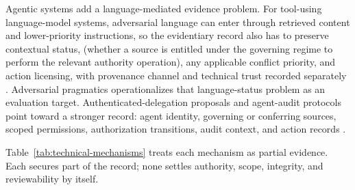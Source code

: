 Agentic systems add a language-mediated evidence problem. For tool-using language-model systems, adversarial language can enter through retrieved content and lower-priority instructions, so the evidentiary record also has to preserve contextual status,  (whether a source is entitled under the governing regime to perform the relevant authority operation), any applicable conflict priority, and action licensing, with provenance channel and technical trust recorded separately \citep{greshake2023not,wallace2024instruction,debenedetti2024agentdojo}. Adversarial pragmatics \citep{reynolds2026adversarialPragmatics} operationalizes that language-status problem as an evaluation target. Authenticated-delegation proposals and agent-audit protocols point toward a stronger record: agent identity, governing or conferring sources, scoped permissions, authorization transitions, audit context, and action records \citep{south2025authenticated,kuehlewind2026audit}.

Table~\ref{tab:technical-mechanisms} treats each mechanism as partial evidence. Each secures part of the record; none settles authority, scope, integrity, and reviewability by itself.

